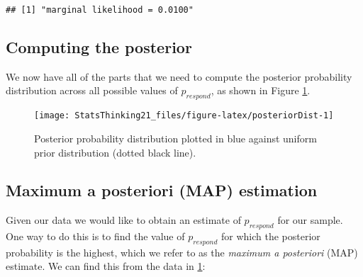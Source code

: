 \documentclass[]{book}
\newenvironment{Shaded}{\begin{snugshade}}{\end{snugshade}}
\newcommand{\KeywordTok}[1]{\textcolor[rgb]{0.13,0.29,0.53}{\textbf{#1}}}
\newcommand{\DataTypeTok}[1]{\textcolor[rgb]{0.13,0.29,0.53}{#1}}
\newcommand{\DecValTok}[1]{\textcolor[rgb]{0.00,0.00,0.81}{#1}}
\newcommand{\FloatTok}[1]{\textcolor[rgb]{0.00,0.00,0.81}{#1}}
\newcommand{\StringTok}[1]{\textcolor[rgb]{0.31,0.60,0.02}{#1}}
\newcommand{\CommentTok}[1]{\textcolor[rgb]{0.56,0.35,0.01}{\textit{#1}}}
\newcommand{\OperatorTok}[1]{\textcolor[rgb]{0.81,0.36,0.00}{\textbf{#1}}}
\newcommand{\NormalTok}[1]{#1}
\theoremstyle{definition}
\theoremstyle{definition}
\theoremstyle{definition}
\theoremstyle{remark}
\begin{document}
\begin{verbatim}
## [1] "marginal likelihood = 0.0100"
\end{verbatim}

\subsection{Computing the posterior}\label{computing-the-posterior-1}

We now have all of the parts that we need to compute the posterior
probability distribution across all possible values of \(p_{respond}\),
as shown in Figure \ref{fig:posteriorDist}.

\begin{Shaded}
\end{Shaded}

\begin{figure}
\texttt{[image: StatsThinking21\_files/figure-latex/posteriorDist-1]} \caption{Posterior probability distribution plotted in blue against uniform prior distribution (dotted black line).}\label{fig:posteriorDist}
\end{figure}

\subsection{Maximum a posteriori (MAP)
estimation}\label{maximum-a-posteriori-map-estimation}

Given our data we would like to obtain an estimate of \(p_{respond}\)
for our sample. One way to do this is to find the value of
\(p_{respond}\) for which the posterior probability is the highest,
which we refer to as the \emph{maximum a posteriori} (MAP) estimate. We
can find this from the data in \ref{fig:posteriorDist}:
\end{document}
